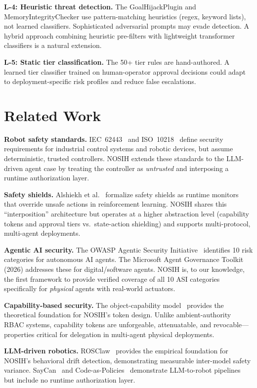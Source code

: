 \documentclass[conference]{IEEEtran}
\begin{document}
\textbf{L-4: Heuristic threat detection.}
The GoalHijackPlugin and MemoryIntegrityChecker use pattern-matching heuristics
(regex, keyword lists), not learned classifiers.
Sophisticated adversarial prompts may evade detection.
A hybrid approach combining heuristic pre-filters with lightweight transformer
classifiers is a natural extension.

\textbf{L-5: Static tier classification.}
The 50+ tier rules are hand-authored.
A learned tier classifier trained on human-operator approval decisions could
adapt to deployment-specific risk profiles and reduce false escalations.

\section{Related Work}
\label{sec:related}

\textbf{Robot safety standards.}
IEC~62443~\cite{iec62443} and ISO~10218~\cite{iso10218} define security
requirements for industrial control systems and robotic devices, but assume
deterministic, trusted controllers.
NOSIH extends these standards to the LLM-driven agent case by treating the
controller as \emph{untrusted} and interposing a runtime authorization layer.

\textbf{Safety shields.}
Alshiekh et al.~\cite{shields} formalize safety shields as runtime monitors
that override unsafe actions in reinforcement learning.
NOSIH shares this ``interposition'' architecture but operates at a higher
abstraction level (capability tokens and approval tiers vs.\ state-action
shielding) and supports multi-protocol, multi-agent deployments.

\textbf{Agentic AI security.}
The OWASP Agentic Security Initiative~\cite{owasp-asi} identifies 10 risk
categories for autonomous AI agents.
The Microsoft Agent Governance Toolkit (2026) addresses these for
digital/software agents.
NOSIH is, to our knowledge, the first framework to provide verified coverage
of all 10 ASI categories specifically for \emph{physical} agents with
real-world actuators.

\textbf{Capability-based security.}
The object-capability model~\cite{miller-ocap} provides the theoretical
foundation for NOSIH's token design.
Unlike ambient-authority RBAC systems, capability tokens are unforgeable,
attenuatable, and revocable---properties critical for delegation in multi-agent
physical deployments.

\textbf{LLM-driven robotics.}
ROSClaw~\cite{rosclaw} provides the empirical foundation for NOSIH's behavioral
drift detection, demonstrating measurable inter-model safety variance.
SayCan~\cite{saycan} and Code-as-Policies~\cite{codeaspolicies} demonstrate
LLM-to-robot pipelines but include no runtime authorization layer.
\end{document}
